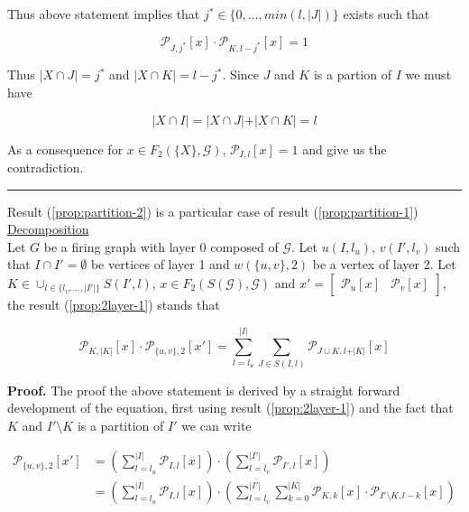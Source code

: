 \documentclass[a4paper, 11pt]{article}
\begin{document}
Thus above statement implies that $j^{*} \in \{0, \ldots, min(l, \vert J \vert)\}$ exists such that  

\begin{equation*}
\mathcal{P}_{J, j^{*}}\left[ x \right]  \cdot \mathcal{P}_{K, l - j^{*}}\left[ x \right] = 1
\end{equation*}

Thus $\vert X \cap J \vert = j^{*}$ and $\vert X \cap K \vert = l - j^{*}$. Since $J$ and $K$ is a partion of $I$ we must have

\begin{equation*}
\vert X \cap I \vert = \vert X \cap J \vert + \vert X \cap K \vert = l
\end{equation*}

As a consequence for $x \in F_2(\{X\}, \mathcal{G})$, $\mathcal{P}_{I,l} \left[ x \right] = 1$ and give us the contradiction. 
\begin{center}
\rule[0pt]{100pt}{1pt} 
\end{center}

Result (\ref{prop:partition-2}) is a particular case of result (\ref{prop:partition-1})\\

\underline{Decomposition}\\

Let $G$ be a firing graph with layer 0 composed of $\mathcal{G}$. Let $u(I, l_u)$, $v(I', l_v)$ such that $I \cap I' = \emptyset$ be vertices of layer 1 and $w(\{ u, v \}, 2)$ be a vertex of layer 2. Let $K \in \cup_{l \in \{l_v, \ldots, \vert I' \vert \}} S(I', l)$, $x \in F_2(S(\mathcal{G}), \mathcal{G})$ and $x' = \begin{bmatrix} \mathcal{P}_{u}[x] &\mathcal{P}_{v}[x] \end{bmatrix}$, the result (\ref{prop:2layer-1}) stands that

\begin{equation*}
\mathcal{P}_{K, \vert K \vert}\left[ x \right] \cdot \mathcal{P}_{\{u, v\}, 2}\left[ x' \right] = \sum_{l=l_u}^{\vert I \vert}  \sum_{J \in S(I, l)} \mathcal{P}_{J \cup K, l + \vert K \vert }\left[ x \right]
\end{equation*}

\textbf{Proof.} The proof the above statement is derived by a straight forward development of the equation, first using result (\ref{prop:2layer-1}) and the fact that $K$ and $I' \setminus K$ is a partition of $I'$ we can write 

\begin{align*}
\mathcal{P}_{\{u, v\}, 2} \left[ x' \right] &= \left( \sum_{l=l_u}^{\vert I \vert} \mathcal{P}_{I, l} \left[ x \right] \right) \cdot \left( \sum_{l=l_v}^{\vert I' \vert} \mathcal{P}_{I', l}\left[ x \right] \right) \\
&= \left( \sum_{l=l_u}^{\vert I \vert} \mathcal{P}_{I, l}\left[ x \right] \right) \cdot \left( \sum_{l=l_v}^{\vert I' \vert}  \sum_{k=0}^{\vert K \vert} \mathcal{P}_{K, k}\left[ x \right] \cdot \mathcal{P}_{I' \setminus K , l-k}\left[ x \right] \right) \\
\end{align*}
\end{document}

